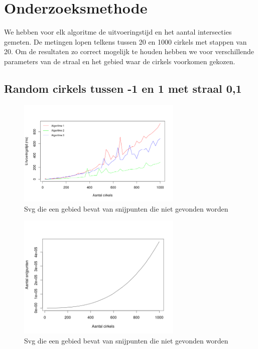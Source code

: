 \documentclass[11pt,a4paper]{article}
\begin{document}
\section{Onderzoeksmethode}

We hebben voor elk algoritme de uitvoeringstijd en het aantal intersecties gemeten. De metingen lopen telkens tussen 20 en 1000 cirkels met stappen van 20. Om de resultaten zo correct mogelijk te houden hebben we voor verschillende parameters van de straal en het gebied waar de cirkels voorkomen gekozen.

\subsection{Random cirkels tussen -1 en 1 met straal 0,1}
\begin{figure}[H]
\centering
\includegraphics[width=0.7\textwidth]{uitvoeringstijd_01.png}
\caption*{Svg die een gebied bevat van snijpunten die niet gevonden worden}
\end{figure}

\begin{figure}[H]
\centering
\includegraphics[width=0.7\textwidth]{snijpunten_01.png}
\caption*{Svg die een gebied bevat van snijpunten die niet gevonden worden}
\end{figure}
\end{document}
